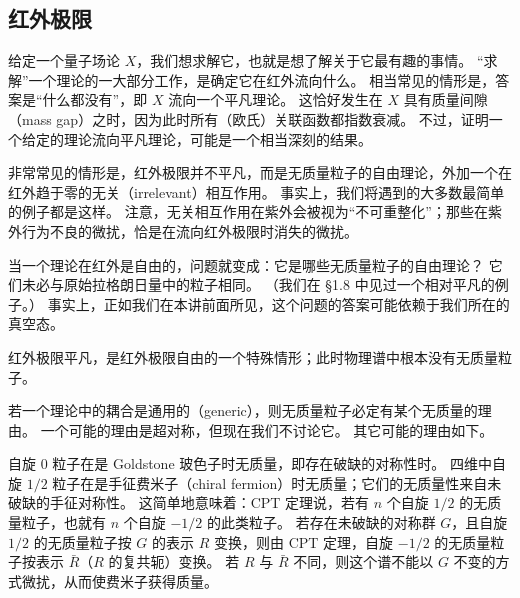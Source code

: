 \subsection{红外极限}

给定一个量子场论 $X$，我们想求解它，也就是想了解关于它最有趣的事情。
“求解”一个理论的一大部分工作，是确定它在红外流向什么。
相当常见的情形是，答案是“什么都没有”，即 $X$ 流向一个平凡理论。
这恰好发生在 $X$ 具有质量间隙（mass gap）之时，因为此时所有（欧氏）关联函数都指数衰减。
不过，证明一个给定的理论流向平凡理论，可能是一个相当深刻的结果。

非常常见的情形是，红外极限并不平凡，而是无质量粒子的自由理论，外加一个在红外趋于零的无关（irrelevant）相互作用。
事实上，我们将遇到的大多数最简单的例子都是这样。
注意，无关相互作用在紫外会被视为“不可重整化”；那些在紫外行为不良的微扰，恰是在流向红外极限时消失的微扰。

当一个理论在红外是自由的，问题就变成：它是哪些无质量粒子的自由理论？
它们未必与原始拉格朗日量中的粒子相同。
（我们在 §1.8 中见过一个相对平凡的例子。）
事实上，正如我们在本讲前面所见，这个问题的答案可能依赖于我们所在的真空态。

红外极限平凡，是红外极限自由的一个特殊情形；此时物理谱中根本没有无质量粒子。

若一个理论中的耦合是通用的（generic），则无质量粒子必定有某个无质量的理由。
一个可能的理由是超对称，但现在我们不讨论它。
其它可能的理由如下。

自旋 $0$ 粒子在是 Goldstone 玻色子时无质量，即存在破缺的对称性时。
四维中自旋 $1/2$ 粒子在是手征费米子（chiral fermion）时无质量；它们的无质量性来自未破缺的手征对称性。
这简单地意味着：CPT 定理说，若有 $n$ 个自旋 $1/2$ 的无质量粒子，也就有 $n$ 个自旋 $-1/2$ 的此类粒子。
若存在未破缺的对称群 $G$，且自旋 $1/2$ 的无质量粒子按 $G$ 的表示 $R$ 变换，则由 CPT 定理，自旋 $-1/2$ 的无质量粒子按表示 $\bar R$（$R$ 的复共轭）变换。
若 $R$ 与 $\bar R$ 不同，则这个谱不能以 $G$ 不变的方式微扰，从而使费米子获得质量。


